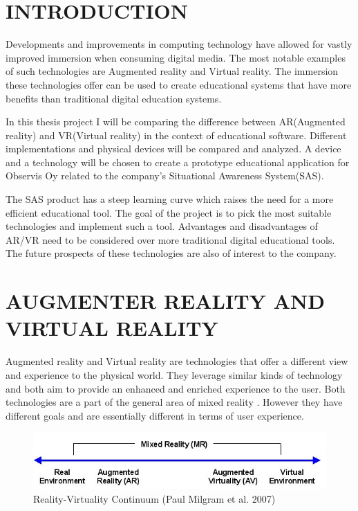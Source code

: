 \documentclass[12pt, a4paper,oneside, nocenter]{thesis}
\begin{document}
\chapter{\MakeUppercase{Introduction}}
Developments and improvements in computing technology have allowed for vastly improved immersion when consuming digital media. The most notable examples of such technologies are Augmented reality and Virtual reality. The immersion these technologies offer can be used to create educational systems that have more benefits than traditional digital education systems. \par
In this thesis project I will be comparing the difference between AR(Augmented reality) and VR(Virtual reality) in the context of educational software. Different implementations and physical devices will be compared and analyzed. A device and a technology will be chosen to create a prototype educational application for Observis Oy related to the company's Situational Awareness System(SAS).\par The SAS product has a steep learning curve which raises the need for a more efficient educational tool. The goal of the project is to pick the most suitable technologies and implement such a tool. Advantages and disadvantages of AR/VR need to be considered over more traditional digital educational tools.
The future prospects of these technologies are also of interest to the company.
\\
\chapter{\MakeUppercase{Augmenter Reality and Virtual Reality}}
Augmented reality and Virtual reality are technologies that offer a different view and experience to the physical world. They leverage similar kinds of technology and both aim to provide an enhanced and enriched experience to the user. Both technologies are a part of the general area of mixed reality . However they have different goals and are essentially different in terms of user experience.

\begin{figure}[H]
\includegraphics[width=\textwidth]{Virtuality_Continuum_2}
\caption{Reality-Virtuality Continuum (Paul Milgram et al. 2007)}
\label{fig:reality-virtuality}
\end{figure}
\end{document}

